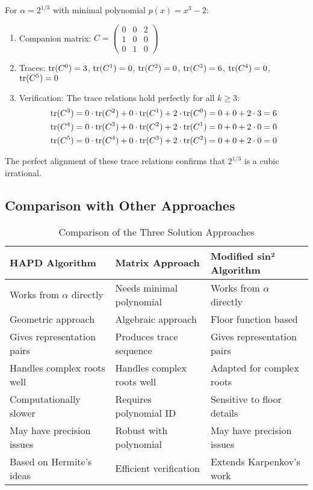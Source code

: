 \begin{example}
For $\alpha = 2^{1/3}$ with minimal polynomial $p(x) = x^3 - 2$:
\begin{enumerate}
    \item Companion matrix: $C = \begin{pmatrix} 0 & 0 & 2 \\ 1 & 0 & 0 \\ 0 & 1 & 0 \end{pmatrix}$
    \item Traces: $\operatorname{tr}(C^0) = 3$, $\operatorname{tr}(C^1) = 0$, $\operatorname{tr}(C^2) = 0$, $\operatorname{tr}(C^3) = 6$, $\operatorname{tr}(C^4) = 0$, $\operatorname{tr}(C^5) = 0$
    \item Verification: The trace relations hold perfectly for all $k \geq 3$:
    \begin{align*}
        \operatorname{tr}(C^3) &= 0 \cdot \operatorname{tr}(C^2) + 0 \cdot \operatorname{tr}(C^1) + 2 \cdot \operatorname{tr}(C^0) = 0 + 0 + 2 \cdot 3 = 6 \\
        \operatorname{tr}(C^4) &= 0 \cdot \operatorname{tr}(C^3) + 0 \cdot \operatorname{tr}(C^2) + 2 \cdot \operatorname{tr}(C^1) = 0 + 0 + 2 \cdot 0 = 0 \\
        \operatorname{tr}(C^5) &= 0 \cdot \operatorname{tr}(C^4) + 0 \cdot \operatorname{tr}(C^3) + 2 \cdot \operatorname{tr}(C^2) = 0 + 0 + 2 \cdot 0 = 0
    \end{align*}
\end{enumerate}
The perfect alignment of these trace relations confirms that $2^{1/3}$ is a cubic irrational.
\end{example}

\subsection{Comparison with Other Approaches}

\begin{table}[ht]
\centering
\small
\caption{Comparison of the Three Solution Approaches}
\label{tab:comparison}
\begin{tabular}{|p{}|p{}|p{}|}
\hline
\textbf{HAPD Algorithm} & \textbf{Matrix Approach} & \textbf{Modified sin² Algorithm} \\
\hline
Works from $\alpha$ directly & Needs minimal polynomial & Works from $\alpha$ directly \\
\hline
Geometric approach & Algebraic approach & Floor function based \\
\hline
Gives representation pairs & Produces trace sequence & Gives representation pairs \\
\hline
Handles complex roots well & Handles complex roots well & Adapted for complex roots \\
\hline
Computationally slower & Requires polynomial ID & Sensitive to floor details \\
\hline
May have precision issues & Robust with polynomial & May have precision issues \\
\hline
Based on Hermite's ideas & Efficient verification & Extends Karpenkov's work \\
\hline
\end{tabular}
\end{table}

